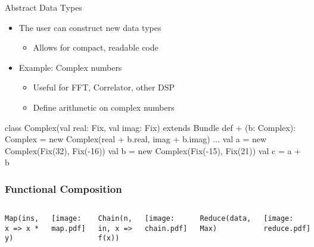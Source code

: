 \documentclass[xcolor=pdflatex,dvipsnames,table]{beamer}
\begin{document}
\begin{frame}[fragile]{Abstract Data Types}
\begin{itemize}
\item The user can construct new data types
\begin{itemize}
\item Allows for compact, readable code
\end{itemize}
\item Example: Complex numbers
\begin{itemize}
\item Useful for FFT, Correlator, other DSP
\item Define arithmetic on complex numbers
\end{itemize}
\end{itemize}

\begin{footnotesize}
\begin{scala}
class Complex(val real: Fix, val imag: Fix) 
    extends Bundle {
  def + (b: Complex): Complex = 
    new Complex(real + b.real, imag + b.imag)
  ...
}
val a = new Complex(Fix(32), Fix(-16))
val b = new Complex(Fix(-15), Fix(21))
val c = a + b
\end{scala}
\end{footnotesize}

\end{frame}

\begin{frame}
\frametitle{Functional Composition}


\begin{Large}
\begin{columns}

\verb+Map(ins, x => x * y)+ \\
\begin{center}
\texttt{[image: map.pdf]} \\[2cm]
\end{center}

\vskip2mm
\verb+Chain(n, in, x => f(x))+ \\
\begin{center}
\texttt{[image: chain.pdf]} \\
\end{center}

\verb+Reduce(data, Max)+ \\
\begin{center}
\texttt{[image: reduce.pdf]} \\
\end{center}


\end{columns}

\end{Large}

\end{frame}
\end{document}

